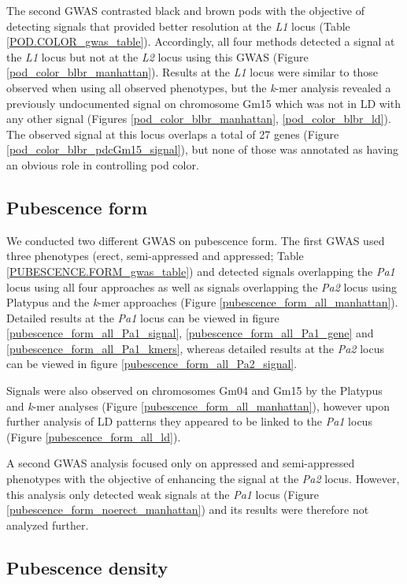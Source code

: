 \documentclass[12pt]{article}
\begin{document}
The second GWAS contrasted black and brown pods with the objective of detecting
signals that provided better resolution at the \emph{L1} locus (Table
\ref{POD.COLOR_gwas_table}).  Accordingly, all four methods detected a signal
at the \emph{L1} locus but not at the \emph{L2} locus using this GWAS (Figure
\ref{pod_color_blbr_manhattan}).  Results at the \emph{L1} locus were similar
to those observed when using all observed phenotypes, but the \emph{k}-mer
analysis revealed a previously undocumented signal on chromosome Gm15 which was
not in LD with any other signal (Figures \ref{pod_color_blbr_manhattan},
\ref{pod_color_blbr_ld}). The observed signal at this locus overlaps a total of
27 genes (Figure \ref{pod_color_blbr_pdcGm15_signal}), but none of those was
annotated as having an obvious role in controlling pod color.

\subsection{Pubescence form}
\label{sv-gwas-pubesence-form}

We conducted two different GWAS on pubescence form. The first GWAS used three
phenotypes (erect, semi-appressed and appressed; Table
\ref{PUBESCENCE.FORM_gwas_table}) and detected signals overlapping the
\emph{Pa1} locus using all four approaches as well as signals overlapping the
\emph{Pa2} locus using Platypus and the \emph{k}-mer approaches (Figure
\ref{pubescence_form_all_manhattan}). Detailed results at the \textit{Pa1} locus
can be viewed in figure \ref{pubescence_form_all_Pa1_signal},
\ref{pubescence_form_all_Pa1_gene} and \ref{pubescence_form_all_Pa1_kmers},
whereas detailed results at the \textit{Pa2} locus can be viewed in figure
\ref{pubescence_form_all_Pa2_signal}.

Signals were also observed on chromosomes Gm04 and Gm15 by the Platypus and
\emph{k}-mer analyses (Figure \ref{pubescence_form_all_manhattan}), however
upon further analysis of LD patterns they appeared to be linked to the
\emph{Pa1} locus (Figure \ref{pubescence_form_all_ld}).

A second GWAS analysis focused only on appressed and semi-appressed phenotypes
with the objective of enhancing the signal at the \emph{Pa2} locus. However,
this analysis only detected weak signals at the \emph{Pa1} locus (Figure
\ref{pubescence_form_noerect_manhattan}) and its results were therefore not
analyzed further.

\subsection{Pubescence density}
\label{sv-gwas-pubescence-density}
\end{document}
